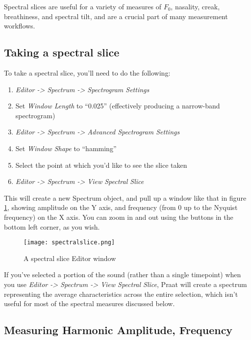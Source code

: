 Spectral slices are useful for a variety of measures of \(F_0\),
nasality, creak, breathiness, and spectral tilt, and are a crucial part
of many measurement workflows.

\hypertarget{taking-a-spectral-slice}{%
\subsection{Taking a spectral slice}\label{taking-a-spectral-slice}}

\label{sub:gettingaslice} To take a spectral slice, you'll need to do
the following:

\begin{enumerate}
\def\labelenumi{\arabic{enumi}.}
\tightlist
\item
  \emph{Editor -\textgreater{} Spectrum -\textgreater{} Spectrogram
  Settings}
\item
  Set \emph{Window Length} to ``0.025'' (effectively producing a
  narrow-band spectrogram)
\item
  \emph{Editor -\textgreater{} Spectrum -\textgreater{} Advanced
  Spectrogram Settings}
\item
  Set \emph{Window Shape} to ``hamming''
\item
  Select the point at which you'd like to see the slice taken
\item
  \emph{Editor -\textgreater{} Spectrum -\textgreater{} View Spectral
  Slice}
\end{enumerate}

This will create a new Spectrum object, and pull up a window like that
in figure \ref{spectralslice}, showing amplitude on the Y axis, and
frequency (from 0 up to the Nyquist frequency) on the X axis. You can
zoom in and out using the buttons in the bottom left corner, as you
wish.

\begin{figure}
  \centerline{
    \mbox{\texttt{[image: spectralslice.png]}}
  }
  \caption{A spectral slice Editor window \label{spectralslice}}

  \end{figure}

If you've selected a portion of the sound (rather than a single
timepoint) when you use \emph{Editor -\textgreater{} Spectrum
-\textgreater{} View Spectral Slice}, Praat will create a spectrum
representing the average characteristics across the entire selection,
which isn't useful for most of the spectral measures discussed below.

\hypertarget{measuring-harmonic-amplitude-frequency}{%
\subsection{Measuring Harmonic Amplitude,
Frequency}\label{measuring-harmonic-amplitude-frequency}}


